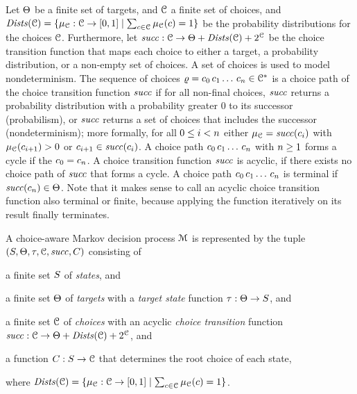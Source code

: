 Let $\Targets$ be a finite set of targets, and
$\Choices$ a finite set of choices, and
$\Dists(\Choices) = \{ \dist_{\Choices} : \Choices \to \ProbRange \mid \sum_{\cmdpChoice \in \Choices} \dist_{\Choices}(\cmdpChoice) = 1 \}$ be the probability distributions for the choices $\Choices$.
Furthermore, let $\choiceTrans : \Choices \rightarrow \Targets + \Dists(\Choices) + 2^{\Choices}$ be the choice transition function that maps each choice to either a target, a probability distribution, or a non-empty set of choices.
A set of choices is used to model nondeterminism.
The sequence of choices $\cpath = \cmdpChoice_0\,\cmdpChoice_1\dotspath\,\cmdpChoice_n \in \Choices^*$ is a choice path of the choice transition function $\choiceTrans$ if for all non-final choices,
$\choiceTrans$ returns a probability distribution with a probability greater 0 to its successor (probabilism),
or $\choiceTrans$ returns a set of choices that includes the successor (nondeterminism);
more formally,
for all $\natrangeex{i}{0}{n}$ either $\dist_{\Choices}=\choiceTrans(\cmdpChoice_{i})$ with $\dist_{\Choices}(\cmdpChoice_{i+1})>0$ or $\cmdpChoice_{i+1}\in\choiceTrans(\cmdpChoice_{i})$.
A choice path $\cmdpChoice_0\,\cmdpChoice_1\dotspath\,\cmdpChoice_n$ with $\intabove{n}{1}$ forms a cycle if the $\cmdpChoice_0=\cmdpChoice_n$.
A choice transition function $\choiceTrans$ is acyclic, if there exists no choice path of $\choiceTrans$ that forms a cycle.
A choice path $\cmdpChoice_0\,\cmdpChoice_1\dotspath\,\cmdpChoice_n$ is terminal if $\choiceTrans(\cmdpChoice_n)\in\Targets$.
Note that it makes sense to call an acyclic choice transition function also terminal or finite, because applying the function iteratively on its result finally terminates.

\begin{definition}
\label{def:CMDP}
A choice-aware Markov decision process $\Cmdp$ is represented by the tuple $(\States, \Targets, \targetstate, \Choices, \choiceTrans, \StateRootChoice)$ consisting of
\begin{compactitem}
\item a finite set $\States$ of \emph{states}, and
\item a finite set $\Targets$ of \emph{targets} with a \emph{target state} function $\targetstate : \Targets \to \States$, and
\item a finite set $\Choices$ of \emph{choices} with an acyclic \emph{choice transition} function $\choiceTrans : \Choices \rightarrow \Targets + \Dists(\Choices) + 2^{\Choices}$, and
\item a function $\StateRootChoice : \States \rightarrow \Choices$ that determines the root choice of each state,
\end{compactitem}
where $\Dists(\Choices) = \{ \dist_{\Choices} : \Choices \to \ProbRange \mid \sum_{\cmdpChoice \in \Choices} \dist_{\Choices}(\cmdpChoice) = 1 \}$.
\end{definition}


